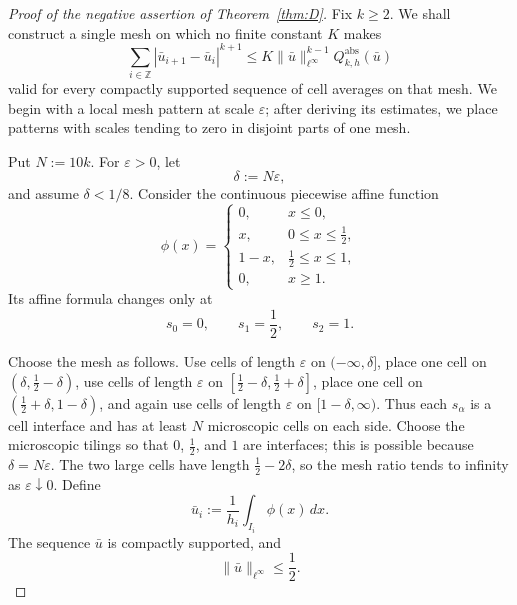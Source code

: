 \documentclass[11pt]{amsart}
\theoremstyle{plain}
\theoremstyle{definition}
\theoremstyle{remark}
\numberwithin{equation}{section}
\theoremstyle{plain}
\begin{document}
\begin{proof}[Proof of the negative assertion of
	Theorem~\ref{thm:D}]
	Fix $k\ge2$.  We shall construct a single mesh on which no finite constant
	$K$ makes
	\begin{equation}\label{eq:arbitrary-mesh-false-estimate}
		\sum_{i\in\mathbb Z}|\bar u_{i+1}-\bar u_i|^{k+1}
		\le K\|\bar u\|_{\ell^\infty}^{k-1}
		Q_{k,h}^{\mathrm{abs}}(\bar u)
	\end{equation}
	valid for every compactly supported sequence of cell averages on that mesh.
	We begin with a local mesh pattern at scale $\varepsilon$; after deriving
	its estimates, we place patterns with scales tending to zero in disjoint
	parts of one mesh.
	
	Put $N:=10k$.  For $\varepsilon>0$, let
	\[
	\delta:=N\varepsilon,
	\]
	and assume $\delta<1/8$.  Consider the continuous piecewise affine function
	\begin{equation}\label{eq:arbitrary-mesh-tent}
		\phi(x)=
		\begin{cases}
			0,&x\le0,\\
			x,&0\le x\le\frac12,\\
			1-x,&\frac12\le x\le1,\\
			0,&x\ge1.
		\end{cases}
	\end{equation}
	Its affine formula changes only at
	\[
	s_0=0,
	\qquad
	s_1=\frac12,
	\qquad
	s_2=1.
	\]
	
	Choose the mesh as follows.  Use cells of length $\varepsilon$ on
	$(-\infty,\delta]$, place one cell on
	$(\delta,\frac12-\delta)$, use cells of length $\varepsilon$ on
	$[\frac12-\delta,\frac12+\delta]$, place one cell on
	$(\frac12+\delta,1-\delta)$, and again use cells of length
	$\varepsilon$ on $[1-\delta,\infty)$.  Thus each $s_\alpha$ is a cell
	interface and has at least $N$ microscopic cells on each side.  Choose the
	microscopic tilings so that $0$, $\frac12$, and $1$ are interfaces; this is
	possible because $\delta=N\varepsilon$.  The two
	large cells have length $\frac12-2\delta$, so the mesh ratio tends to
	infinity as $\varepsilon\downarrow0$.  Define
	\begin{equation}\label{eq:tent-cell-average-data}
		\bar u_i:=\frac1{h_i}\int_{I_i}\phi(x)\,dx.
	\end{equation}
	The sequence $\bar u$ is compactly supported, and
	\begin{equation}\label{eq:tent-linfty-bound}
		\|\bar u\|_{\ell^\infty}\le\frac12.
	\end{equation}
	

\end{proof}
\end{document}

